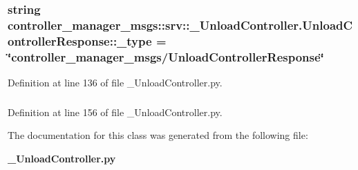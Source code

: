 \subsubsection[{\-\_\-type}]{\setlength{\rightskip}{0pt plus 5cm}string {\bf controller\-\_\-manager\-\_\-msgs\-::srv\-::\-\_\-\-Unload\-Controller.\-Unload\-Controller\-Response\-::\-\_\-type} = \char`\"{}controller\-\_\-manager\-\_\-msgs/{\bf \-Unload\-Controller\-Response}\char`\"{}\hspace{0.3cm}{\ttfamily  [static, private]}}\label{classcontroller__manager__msgs_1_1srv_1_1__UnloadController_1_1UnloadControllerResponse_a1f8f013ee884487f3e1097d0e65bbb2f}


\-Definition at line 136 of file \-\_\-\-Unload\-Controller.\-py.

\subsubsection[{ok}]{}\label{classcontroller__manager__msgs_1_1srv_1_1__UnloadController_1_1UnloadControllerResponse_a17eb1f5d5158d1300efa7af357a02da6}


\-Definition at line 156 of file \-\_\-\-Unload\-Controller.\-py.



\-The documentation for this class was generated from the following file\-:\begin{DoxyCompactItemize}
\item 
{\bf \-\_\-\-Unload\-Controller.\-py}\end{DoxyCompactItemize}
